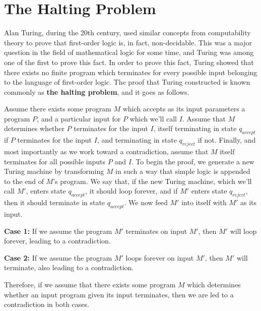 \documentclass{article}
\begin{document}
\section{The Halting Problem}
Alan Turing, during the 20th century, used similar concepts from computability theory to prove that first-order logic is, in fact, non-decidable.  This was a major question in the field of mathematical logic for some time, and Turing was among one of the first to prove this fact.  In order to prove this fact, Turing showed that there exists no finite program which terminates for every possible input belonging to the language of first-order logic.  The proof that Turing constructed is known commonly as \textbf{the halting problem}, and it goes as follows. \cite{7}
\begin{prf}
	Assume there exists some program $M$ which accepts as its input parameters a program $P$, and a particular input for $P$ which we'll call $I$.  Assume that $M$ determines whether $P$ terminates for the input $I$, itself terminating in state $q_{accept}$ if $P$ terminates for the input $I$, and terminating in state $q_{reject}$ if not.  Finally, and most importantly as we work toward a contradiction, assume that $M$ itself terminates for all possible inputs $P$ and $I$.  To begin the proof, we generate a new Turing machine by transforming $M$ in such a way that simple logic is appended to the end of $M$'s program.  We say that, if the new Turing machine, which we'll call $M'$, enters state $q_{accept}$, it should loop forever, and if $M'$ enters state $q_{reject}$, then it should terminate in state $q_{accept}$.  We now feed $M'$ into itself with $M'$ as its input.\\
\begin{adjustwidth}{0.5cm}{}
	\textbf{Case 1:} If we assume the program $M'$ terminates on input $M'$, then $M'$ will loop forever, leading to a contradiction.\\
\end{adjustwidth}
\begin{adjustwidth}{0.5cm}{}
	\textbf{Case 2:} If we assume the program $M'$ loops forever on input $M'$, then $M'$ will terminate, also leading to a contradiction.\\
\end{adjustwidth}
	\noindent Therefore, if we assume that there exists some program $M$ which determines whether an input program given its input terminates, then we are led to a contradiction in both cases. \cite{5} \qedsymbol
\end{prf}
\end{document}
